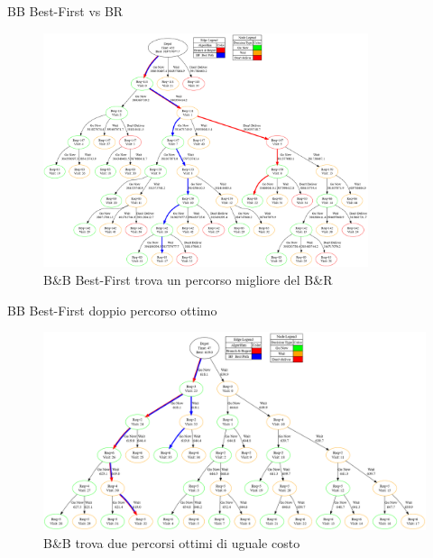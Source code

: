 \documentclass[10pt]{beamer}
\begin{document}
    \begin{frame}{BB Best-First vs BR}
        \begin{figure}[h!]
            \centering
            \includegraphics[width=0.85\textwidth]{Images/omg.png}
            \caption{B\&B Best-First trova un percorso migliore del B\&R}
        \label{fig:BBBFmigliore}
        \end{figure}
    \end{frame}

    \begin{frame}{BB Best-First doppio percorso ottimo}
        \begin{figure}[h!]
            \centering
            \includegraphics[width=1\textwidth]{Images/raro.png}
            \caption{B\&B trova due percorsi ottimi di uguale costo}
            \label{fig:BBBFduepath}
        \end{figure}
    \end{frame}
\end{document}
